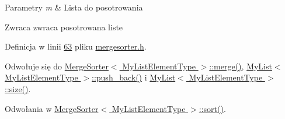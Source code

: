 \begin{DoxyParams}{Parametry}
{\em m} & Lista do posotrowania \\
\hline
\end{DoxyParams}
\begin{DoxyReturn}{Zwraca}
zwraca posotrowana liste 
\end{DoxyReturn}


Definicja w linii \hyperlink{mergesorter_8h_source_l00063}{63} pliku \hyperlink{mergesorter_8h_source}{mergesorter.\-h}.



Odwołuje się do \hyperlink{mergesorter_8h_source_l00026}{Merge\-Sorter$<$ My\-List\-Element\-Type $>$\-::merge()}, \hyperlink{mylist_8h_source_l00112}{My\-List$<$ My\-List\-Element\-Type $>$\-::push\-\_\-back()} i \hyperlink{mylist_8h_source_l00066}{My\-List$<$ My\-List\-Element\-Type $>$\-::size()}.



Odwołania w \hyperlink{mergesorter_8h_source_l00083}{Merge\-Sorter$<$ My\-List\-Element\-Type $>$\-::sort()}.



